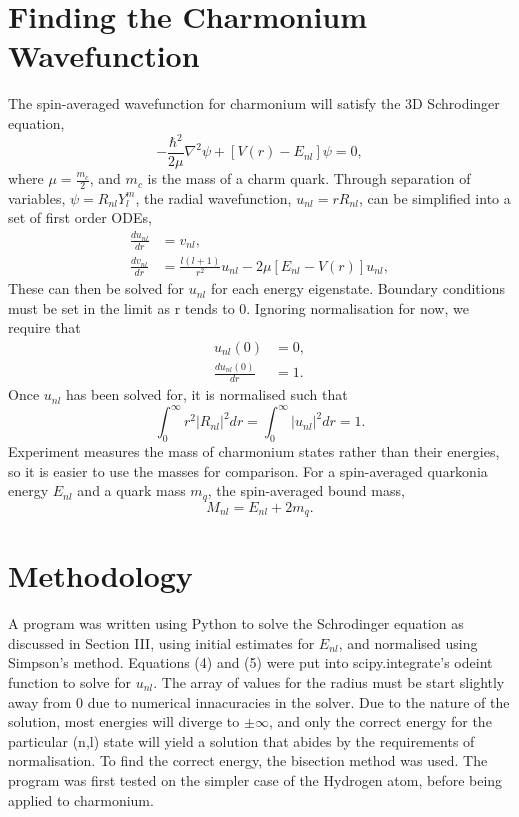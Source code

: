 \documentclass[10pt, twocolumn]{article}
\begin{document}
\section{Finding the Charmonium Wavefunction}
The spin-averaged wavefunction for charmonium will satisfy the 3D Schrodinger equation,
\begin{equation}
    -\frac{\hbar^2}{2\mu}\nabla^2\psi + \left[V(r) - E_{nl}\right]\psi = 0,
\end{equation}
where $\mu = \frac{m_c}{2}$, and $m_c$ is the mass of a charm quark.
Through separation of variables, $\psi = R_{nl}Y^m_l$, the radial wavefunction, $u_{nl} = rR_{nl}$, can be simplified into a set of first order ODEs, 
\begin{align}
    \frac{du_{nl}}{dr} &= v_{nl}, \\
    \frac{dv_{nl}}{dr} &= \frac{l(l+1)}{r^2}u_{nl} - 2\mu\left[E_{nl} - V(r)\right]u_{nl},
\end{align}
These can then be solved for $u_{nl}$ for each energy eigenstate.
Boundary conditions must be set in the limit as r tends to 0.
Ignoring normalisation for now, we require that
\begin{align}
    u_{nl}(0) &= 0, \\
    \frac{du_{nl}(0)}{dr} &= 1.
\end{align}
Once $u_{nl}$ has been solved for, it is normalised such that
\begin{equation}
    \int_0^\infty r^2|R_{nl}|^2dr = \int_0^\infty |u_{nl}|^2dr = 1.
\end{equation}
Experiment measures the mass of charmonium states rather than their energies, so it is easier to use the masses for comparison.
For a spin-averaged quarkonia energy $E_{nl}$ and a quark mass $m_q$, the spin-averaged bound mass,
\begin{equation}
    M_{nl} = E_{nl} + 2m_q.
\end{equation}


\section{Methodology}
A program was written using Python to solve the Schrodinger equation as discussed in Section \RN{3}, using initial estimates for $E_{nl}$, and normalised using Simpson's method.
Equations (4) and (5) were put into scipy.integrate's odeint function to solve for $u_{nl}$. 
The array of values for the radius must be start slightly away from 0 due to numerical innacuracies in the solver.
Due to the nature of the solution, most energies will diverge to $\pm\infty$, and only the correct energy for the particular (n,l) state will yield a solution that abides by the requirements of normalisation.
To find the correct energy, the bisection method was used.
The program was first tested on the simpler case of the Hydrogen atom, before being applied to charmonium.
\end{document}
